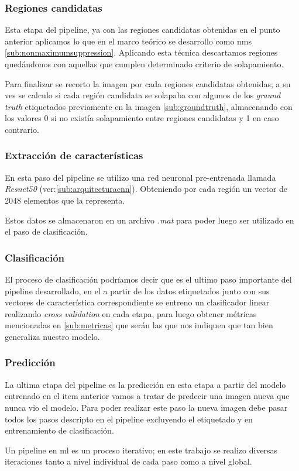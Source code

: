 \subsubsection*{Regiones candidatas}
Esta etapa del pipeline, ya con las regiones candidatas obtenidas en el punto anterior aplicamos lo que en el marco teórico se desarrollo como \ac{nms} \ref{sub:nonmaximumsuppression}. Aplicando esta técnica descartamos regiones quedándonos con aquellas que cumplen determinado criterio de solapamiento.

Para finalizar se recorto la imagen por cada regiones candidatas obtenidas; a su ves se calculo si cada región candidata se solapaba con algunos de los \textit{graund truth} etiquetados previamente en la imagen \ref{sub:groundtruth}, almacenando con los valores 0 si no existía solapamiento entre regiones candidatas y 1 en caso contrario.

\subsubsection*{Extracción de características}
En esta paso del pipeline se utilizo una red neuronal pre-entrenada llamada \textit{Resnet50} (ver:\ref{sub:arquitecturacnn}). Obteniendo por cada región un vector de 2048 elementos que la representa.

Estos datos se almacenaron en un archivo \textit{.mat} para poder luego ser utilizado en el paso de clasificación.

\subsubsection*{Clasificación}
El proceso de clasificación podríamos decir que es el ultimo paso importante del pipeline desarrollado, en el a partir de los datos etiquetados junto con sus vectores de característica correspondiente se entreno un clasificador linear realizando \textit{cross validation} en cada etapa, para luego obtener métricas mencionadas en \ref{sub:metricas} que serán las que nos indiquen que tan bien generaliza nuestro modelo.

\subsubsection*{Predicción}
La ultima etapa del pipeline es la predicción en esta etapa a partir del modelo entrenado en el item anterior vamos a tratar de predecir una imagen nueva que nunca vio el modelo. Para poder realizar este paso la nueva imagen debe pasar todos los pasos descripto en el pipeline excluyendo el etiquetado y en entrenamiento de clasificación.



Un pipeline en \ac{ml} es un proceso iterativo; en este trabajo se realizo diversas iteraciones tanto a nivel individual de cada paso como a nivel global. 